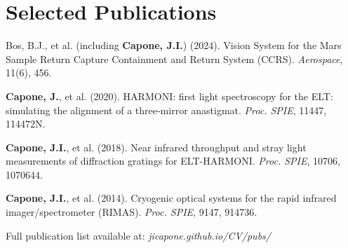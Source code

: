 \documentclass[letterpaper,11pt]{article}
\begin{document}
\section{Selected Publications}
\begin{itemize}[leftmargin=0.15in, label={}, noitemsep, topsep=0pt]
    \small{
        \item{Bos, B.J., et al. (including \textbf{Capone, J.I.}) (2024). Vision System for the Mars Sample Return Capture Containment and Return System (CCRS). \textit{Aerospace}, 11(6), 456.}
          \item{\textbf{Capone, J.}, et al. (2020). HARMONI: first light spectroscopy for the ELT: simulating the alignment of a three-mirror anastigmat. \textit{Proc. SPIE}, 11447, 114472N.}
          \item{\textbf{Capone, J.I.}, et al. (2018). Near infrared throughput and stray light measurements of diffraction gratings for ELT-HARMONI. \textit{Proc. SPIE}, 10706, 1070644.}
          \item{\textbf{Capone, J.I.}, et al. (2014). Cryogenic optical systems for the rapid infrared imager/spectrometer (RIMAS). \textit{Proc. SPIE}, 9147, 914736.}
          \bigskip
          \item{Full publication list available at: \textit{jicapone.github.io/CV/pubs/}}
    }
\end{itemize}
\end{document}
